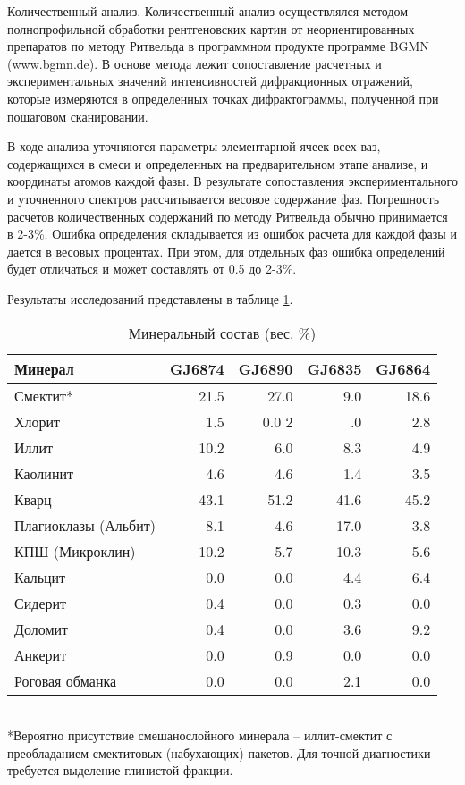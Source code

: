Количественный анализ. Количественный анализ осуществлялся методом полнопрофильной обработки рентгеновских картин от неориентированных препаратов по методу Ритвельда в программном продукте программе BGMN (www.bgmn.de). В основе метода лежит сопоставление расчетных и экспериментальных значений интенсивностей дифракционных отражений, которые измеряются в определенных точках дифрактограммы, полученной при пошаговом сканировании. 

В ходе анализа уточняются параметры элементарной ячеек всех ваз, содержащихся в смеси и определенных на предварительном этапе анализе, и координаты атомов каждой фазы. В результате сопоставления экспериментального и уточненного спектров рассчитывается весовое содержание фаз. Погрешность расчетов количественных содержаний по методу Ритвельда обычно принимается в 2-3\%. Ошибка определения складывается из ошибок расчета для каждой фазы и дается в весовых процентах. При этом, для отдельных фаз ошибка определений будет отличаться и может составлять от 0.5 до 2-3\%.

Результаты исследований представлены в таблице \ref{tab:mineral}.


\begin{table}[]
    \centering
    \caption{Минеральный состав (вес. \%)} \label{tab:mineral}
    \begin{tabular}{@{}lrrrr@{}}
    \toprule
    Минерал & GJ6874 &	GJ6890 & GJ6835 & GJ6864  \\ \midrule
    Смектит*	& 21.5	& 27.0	& 9.0	& 18.6 \\
    Хлорит	& 1.5	& 0.0	2& .0	& 2.8 \\
    Иллит	& 10.2	& 6.0	& 8.3	& 4.9 \\
    Каолинит	& 4.6	& 4.6	& 1.4	& 3.5 \\
    Кварц	& 43.1	& 51.2	& 41.6	& 45.2 \\
    Плагиоклазы (Альбит)	& 8.1	& 4.6	& 17.0	& 3.8 \\
    КПШ (Микроклин)	& 10.2	& 5.7	& 10.3	& 5.6 \\
    Кальцит	& 0.0	& 0.0	& 4.4	& 6.4 \\
    Сидерит	& 0.4	& 0.0	& 0.3	& 0.0 \\
    Доломит	& 0.4	& 0.0	& 3.6	& 9.2 \\
    Анкерит	& 0.0	& 0.9	& 0.0	& 0.0 \\
    Роговая обманка	& 0.0	& 0.0	& 2.1	& 0.0 \\ \bottomrule
    \end{tabular}
    \\ *Вероятно присутствие смешанослойного минерала – иллит-смектит с преобладанием смектитовых (набухающих) пакетов. Для точной диагностики требуется выделение глинистой фракции.
\end{table}
	




